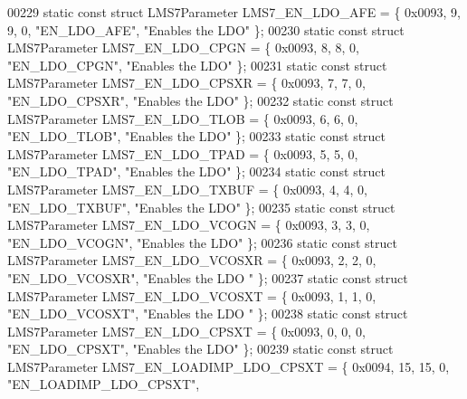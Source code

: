 \begin{DoxyCode}
00229 \textcolor{keyword}{static} \textcolor{keyword}{const} \textcolor{keyword}{struct }LMS7Parameter LMS7_EN_LDO_AFE = \{ 0x0093, 9, 9, 0, \textcolor{stringliteral}{"EN\_LDO\_AFE"}, \textcolor{stringliteral}{"Enables the LDO"} \};
00230 \textcolor{keyword}{static} \textcolor{keyword}{const} \textcolor{keyword}{struct }LMS7Parameter LMS7_EN_LDO_CPGN = \{ 0x0093, 8, 8, 0, \textcolor{stringliteral}{"EN\_LDO\_CPGN"}, \textcolor{stringliteral}{"Enables the LDO"} \};
00231 \textcolor{keyword}{static} \textcolor{keyword}{const} \textcolor{keyword}{struct }LMS7Parameter LMS7_EN_LDO_CPSXR = \{ 0x0093, 7, 7, 0, \textcolor{stringliteral}{"EN\_LDO\_CPSXR"}, \textcolor{stringliteral}{"Enables the LDO"} 
      \};
00232 \textcolor{keyword}{static} \textcolor{keyword}{const} \textcolor{keyword}{struct }LMS7Parameter LMS7_EN_LDO_TLOB = \{ 0x0093, 6, 6, 0, \textcolor{stringliteral}{"EN\_LDO\_TLOB"}, \textcolor{stringliteral}{"Enables the LDO"} \};
00233 \textcolor{keyword}{static} \textcolor{keyword}{const} \textcolor{keyword}{struct }LMS7Parameter LMS7_EN_LDO_TPAD = \{ 0x0093, 5, 5, 0, \textcolor{stringliteral}{"EN\_LDO\_TPAD"}, \textcolor{stringliteral}{"Enables the LDO"} \};
00234 \textcolor{keyword}{static} \textcolor{keyword}{const} \textcolor{keyword}{struct }LMS7Parameter LMS7_EN_LDO_TXBUF = \{ 0x0093, 4, 4, 0, \textcolor{stringliteral}{"EN\_LDO\_TXBUF"}, \textcolor{stringliteral}{"Enables the LDO"} 
      \};
00235 \textcolor{keyword}{static} \textcolor{keyword}{const} \textcolor{keyword}{struct }LMS7Parameter LMS7_EN_LDO_VCOGN = \{ 0x0093, 3, 3, 0, \textcolor{stringliteral}{"EN\_LDO\_VCOGN"}, \textcolor{stringliteral}{"Enables the LDO"} 
      \};
00236 \textcolor{keyword}{static} \textcolor{keyword}{const} \textcolor{keyword}{struct }LMS7Parameter LMS7_EN_LDO_VCOSXR = \{ 0x0093, 2, 2, 0, \textcolor{stringliteral}{"EN\_LDO\_VCOSXR"}, \textcolor{stringliteral}{"Enables the LDO
      "} \};
00237 \textcolor{keyword}{static} \textcolor{keyword}{const} \textcolor{keyword}{struct }LMS7Parameter LMS7_EN_LDO_VCOSXT = \{ 0x0093, 1, 1, 0, \textcolor{stringliteral}{"EN\_LDO\_VCOSXT"}, \textcolor{stringliteral}{"Enables the LDO
      "} \};
00238 \textcolor{keyword}{static} \textcolor{keyword}{const} \textcolor{keyword}{struct }LMS7Parameter LMS7_EN_LDO_CPSXT = \{ 0x0093, 0, 0, 0, \textcolor{stringliteral}{"EN\_LDO\_CPSXT"}, \textcolor{stringliteral}{"Enables the LDO"} 
      \};
00239 \textcolor{keyword}{static} \textcolor{keyword}{const} \textcolor{keyword}{struct }LMS7Parameter LMS7_EN_LOADIMP_LDO_CPSXT = \{ 0x0094, 15, 15, 0, \textcolor{stringliteral}{"EN\_LOADIMP\_LDO\_CPSXT"}, \textcolor{stringliteral}{
}
\end{DoxyCode}
